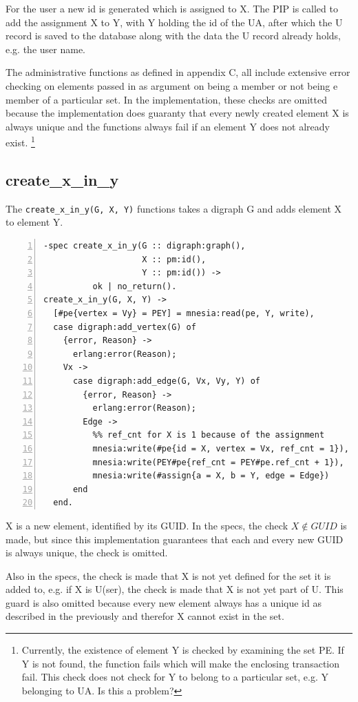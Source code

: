 \documentclass[12pt,a4paper,titlepage]{book}
\begin{document}
	For the user a new id is generated which is assigned to X. The PIP is called to add the assignment X to Y, with Y holding the id of the UA, after which the U record is saved to the database along with the data the U record already holds, e.g. the user name.
		
	The administrative functions as defined in appendix C, all include extensive error checking on elements passed in as argument on being a member or not being e member of a particular set. In the implementation, these checks are omitted because the implementation does guaranty that every newly created element X is always unique and the functions always fail if an element Y does not already exist.	\footnote{Currently, the existence of element Y is checked by examining the set PE. If Y is not found, the function fails which will make the enclosing transaction fail. This check does not check for Y to belong to a particular set, e.g. Y belonging to UA. Is this a problem?}
	
	\subsection{create\_x\_in\_y}
	
	The \lstinline|create_x_in_y(G, X, Y)| functions takes a digraph G and adds element X to element Y.
		
	\begin{lstlisting}[caption={create\_x\_in\_y/3}, basicstyle=\footnotesize, breaklines=false, numbers=left]
-spec create_x_in_y(G :: digraph:graph(),
                    X :: pm:id(),
                    Y :: pm:id()) ->
          ok | no_return().
create_x_in_y(G, X, Y) ->
  [#pe{vertex = Vy} = PEY] = mnesia:read(pe, Y, write),
  case digraph:add_vertex(G) of
    {error, Reason} ->
      erlang:error(Reason);
    Vx ->
      case digraph:add_edge(G, Vx, Vy, Y) of
        {error, Reason} ->
          erlang:error(Reason);
        Edge ->
          %% ref_cnt for X is 1 because of the assignment
          mnesia:write(#pe{id = X, vertex = Vx, ref_cnt = 1}),
          mnesia:write(PEY#pe{ref_cnt = PEY#pe.ref_cnt + 1}),
          mnesia:write(#assign{a = X, b = Y, edge = Edge})
      end
  end. \end{lstlisting}		
	
	X is a new element, identified by its GUID. In the specs, the check $ X \notin GUID $ is made, but since this implementation guarantees that each and every new GUID is always unique, the check is omitted.
	
	Also in the specs, the check is made that X is not yet defined for the set it is added to, e.g. if X is U(ser), the check is made that X is not yet part of U. This guard is also omitted because every new element always has a unique id as described in the previously and therefor X cannot exist in the set.
	
\end{document}
